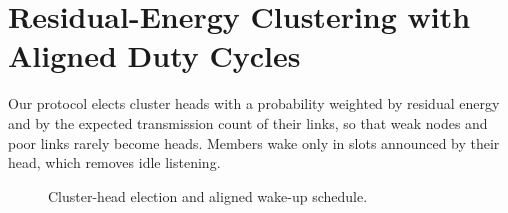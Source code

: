 \chapter{Residual-Energy Clustering with Aligned Duty Cycles}
\label{ch:method}

Our protocol elects cluster heads with a probability weighted by residual energy and by the
expected transmission count of their links, so that weak nodes and poor links rarely become
heads. Members wake only in slots announced by their head, which removes idle listening.

\begin{figure}[htbp]
  \centering
  \caption{Cluster-head election and aligned wake-up schedule.}
  \label{fig:proto}
\end{figure}
